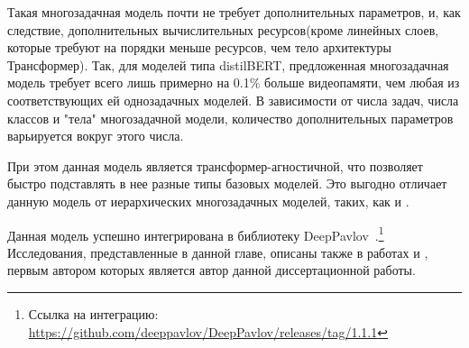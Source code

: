 Такая многозадачная модель почти не требует дополнительных параметров, и, как следствие, дополнительных вычислительных ресурсов(кроме линейных слоев, которые требуют на порядки меньше ресурсов, чем тело архитектуры Трансформер). Так, для моделей типа distilBERT, предложенная многозадачная модель требует всего лишь примерно на  0.1\% больше видеопамяти, чем любая из соответствующих ей однозадачных моделей. В зависимости от числа задач, числа классов и "тела" многозадачной модели, количество дополнительных параметров варьируется вокруг этого числа. 

При этом данная модель является трансформер-агностичной, что позволяет быстро подставлять в нее разные типы базовых моделей. Это выгодно отличает данную модель от иерархических многозадачных моделей, таких, как \cite{stickland_2019} и \cite{TaskEmbedded2021}. 

Данная модель успешно интегрирована в библиотеку DeepPavlov~\cite{dp_2023}.\footnote{Ссылка на интеграцию: \url{https://github.com/deeppavlov/DeepPavlov/releases/tag/1.1.1}} Исследования, представленные в данной главе, описаны также в работах \cite{rumtl} и \cite{enmtl}, первым автором которых является автор данной диссертационной работы.

